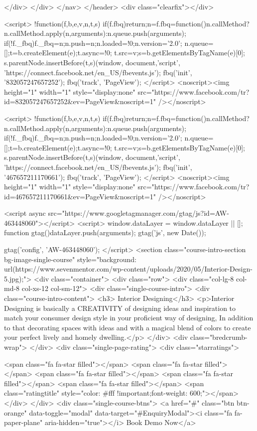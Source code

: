 {</div>
</div>
</nav>
</header>
<div class="clearfix"></div>

<script>
!function(f,b,e,v,n,t,s)
{if(f.fbq)return;n=f.fbq=function(){n.callMethod?
n.callMethod.apply(n,arguments):n.queue.push(arguments)};
if(!f._fbq)f._fbq=n;n.push=n;n.loaded=!0;n.version='2.0';
n.queue=[];t=b.createElement(e);t.async=!0;
t.src=v;s=b.getElementsByTagName(e)[0];
s.parentNode.insertBefore(t,s)}(window, document,'script',
'https://connect.facebook.net/en_US/fbevents.js');
fbq('init', '832057247657252');
fbq('track', 'PageView');
</script>
<noscript><img height="1" width="1" style="display:none"
src="https://www.facebook.com/tr?id=832057247657252&ev=PageView&noscript=1"
/></noscript>


<script>
!function(f,b,e,v,n,t,s)
{if(f.fbq)return;n=f.fbq=function(){n.callMethod?
n.callMethod.apply(n,arguments):n.queue.push(arguments)};
if(!f._fbq)f._fbq=n;n.push=n;n.loaded=!0;n.version='2.0';
n.queue=[];t=b.createElement(e);t.async=!0;
t.src=v;s=b.getElementsByTagName(e)[0];
s.parentNode.insertBefore(t,s)}(window, document,'script',
'https://connect.facebook.net/en_US/fbevents.js');
fbq('init', '467657211170661');
fbq('track', 'PageView');
</script>
<noscript><img height="1" width="1" style="display:none"
src="https://www.facebook.com/tr?id=467657211170661&ev=PageView&noscript=1"
/></noscript>


<script async src="https://www.googletagmanager.com/gtag/js?id=AW-463448060"></script>
<script>
  window.dataLayer = window.dataLayer || [];
  function gtag(){dataLayer.push(arguments);}
  gtag('js', new Date());

  gtag('config', 'AW-463448060');
</script>
<section class="course-intro-section bg-image-single-course" style="background: url(https://www.sevenmentor.com/wp-content/uploads/2020/05/Interior-Design-5.jpg);">
<div class="container">
<div class="row">
<div class="col-lg-8 col-md-8 col-xs-12 col-sm-12">
<div class="single-course-intro">
<div class="course-intro-content">
<h3> Interior Designing</h3>
<p>Interior Designing is basically a CREATIVITY of designing ideas and inspiration to match your consumer design style in your proficient way of designing, In addition to that decorating spaces with ideas and with a magical blend of colors to create your perfect lively and homely dwelling.</p>
</div>
<div class="bredcrumb-wrap">
</div>
<div class="single-page-rating">
<div class="starratings">

<span class="fa fa-star filled"></span>
<span class="fa fa-star filled"></span>
<span class="fa fa-star filled"></span>
<span class="fa fa-star filled"></span>
<span class="fa fa-star filled"></span>
<span class="ratingtitle" style="color: #fff !important;font-weight: 600;"></span>
</div>
</div>
<div class="single-course-btns">
<a href="#" class="btn btn-orange" data-toggle="modal" data-target="#EnquiryModal"><i class="fa fa-paper-plane" aria-hidden="true"></i> Book Demo Now</a>

}
